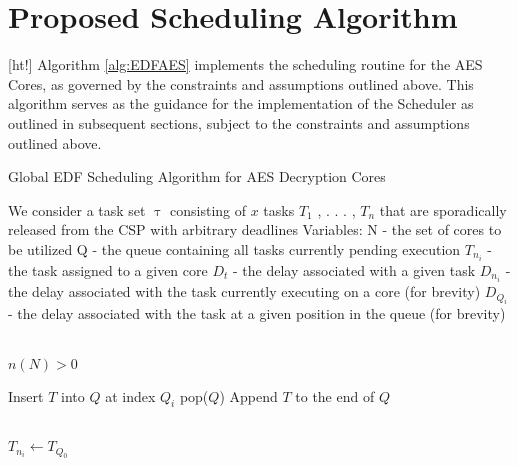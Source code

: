 \section{Proposed Scheduling Algorithm}\label{subsec:AlgoImpl}[ht!]
Algorithm \ref{alg:EDFAES} implements the scheduling routine for the AES Cores, as governed by the constraints and assumptions outlined above. This algorithm serves as the guidance for the implementation of the Scheduler as outlined in subsequent sections, subject to the constraints and assumptions outlined above.
\begin{algorithm}
    \caption{Global EDF Scheduling Algorithm for AES Decryption Cores}\label{alg:EDFAES}
    \begin{algorithmic}

        \State We consider a task set $\uptau$ consisting of $x$ tasks $T_1$ , . . . , $T_n$ that are sporadically released from the CSP with arbitrary deadlines
        \State Variables: 
        \State N - the set of cores to be utilized
        \State Q - the queue containing all tasks currently pending execution
        \State $T_{n_i}$ - the task assigned to a given core
        \State $D_t$ - the delay associated with a given task
        \State $D_{n_i}$ - the delay associated with the task currently executing on a core (for brevity)
        \State $D_{Q_i}$ - the delay associated with the task at a given position in the queue (for brevity)

        \\

        \Require $n(N) > 0$ 

                    \State Insert $T$ into $Q$ at index $Q_i$
                    \State \Return pop($Q$)
                \EndIf
            \EndFor
            \State Append $T$ to the end of $Q$ 
        \EndFunction

        \\

         
                        \State $T_{n_i} \gets T_{Q_0}$ 


\end{algorithmic}
\end{algorithm}
